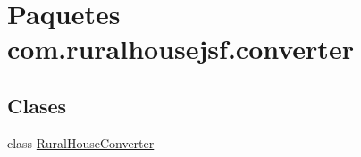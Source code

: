 \hypertarget{a00111}{}\section{Paquetes com.\+ruralhousejsf.\+converter}
\label{a00111}
\subsection*{Clases}
\begin{DoxyCompactItemize}
\item 
class \mbox{\hyperlink{a00140}{Rural\+House\+Converter}}
\end{DoxyCompactItemize}
